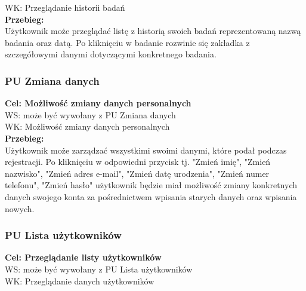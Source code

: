 \documentclass[12pt, letterpaper]{article}
\begin{document}
		WK: Przeglądanie historii badań\\
		
		\textbf{Przebieg:}\\
		Użytkownik może przeglądać listę z historią swoich badań reprezentowaną nazwą badania oraz datą. Po kliknięciu w badanie rozwinie się zakładka z szczegółowymi danymi dotyczącymi konkretnego badania.
		 \\
		 
		
		\subsubsection{PU Zmiana danych}
		
		\quad
		
		\textbf{Cel: Możliwość zmiany danych personalnych}\\
		
		WS: może być wywołany z PU Zmiana danych\\
		
		WK: Możliwość zmiany danych personalnych\\
		
		\textbf{Przebieg:}\\
		Użytkownik może zarządzać wszystkimi swoimi danymi, które podał podczas rejestracji. Po kliknięciu w odpowiedni przycisk tj. "Zmień imię", "Zmień nazwisko", "Zmień adres e-mail", "Zmień datę urodzenia", "Zmień numer telefonu", "Zmień hasło" użytkownik będzie miał możliwość zmiany konkretnych danych swojego konta za pośrednictwem wpisania starych danych oraz wpisania nowych.
		 \\
			
		
		
		\subsubsection{PU Lista użytkowników}
		
		\quad
		
		\textbf{Cel: Przeglądanie listy użytkowników}\\
		
		WS: może być wywołany z PU Lista użytkowników\\
		
		WK: Przeglądanie danych użytkowników \\
		
\end{document}
